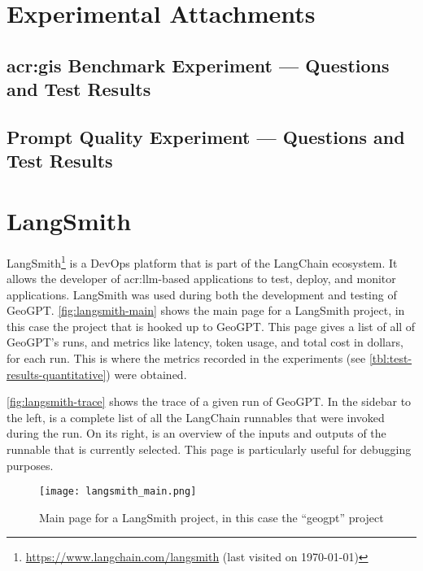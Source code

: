 \appendix

\chapter{Experimental Attachments}
\label{app:experiments}

\section[GIS Benchmark Experiment --- Questions and Test Results]{\acrshort{acr:gis} Benchmark Experiment --- Questions and Test Results}
\label{appsec:questions-and-answer}


\newpage


\newpage

\section{Prompt Quality Experiment --- Questions and Test Results}

\newpage



\chapter{LangSmith}
\label{app:langsmith}

LangSmith\footnote{\url{https://www.langchain.com/langsmith} (last visited on \today)} is a DevOps platform that is part of the LangChain ecosystem. It allows the developer of \acrshort{acr:llm}-based applications to test, deploy, and monitor applications. LangSmith was used during both the development and testing of GeoGPT. \autoref{fig:langsmith-main} shows the main page for a LangSmith project, in this case the project that is hooked up to GeoGPT. This page gives a list of all of GeoGPT's runs, and metrics like latency, token usage, and total cost in dollars, for each run. This is where the metrics recorded in the experiments (see \autoref{tbl:test-results-quantitative}) were obtained.

\autoref{fig:langsmith-trace} shows the trace of a given run of GeoGPT. In the sidebar to the left, is a complete list of all the LangChain runnables that were invoked during the run. On its right, is an overview of the inputs and outputs of the runnable that is currently selected. This page is particularly useful for debugging purposes.

\begin{sidewaysfigure}
    \centering
    \texttt{[image: langsmith\_main.png]}
    \caption[Main page for a LangSmith project]{Main page for a LangSmith project, in this case the \enquote{geogpt} project}
    \label{fig:langsmith-main}
\end{sidewaysfigure}

